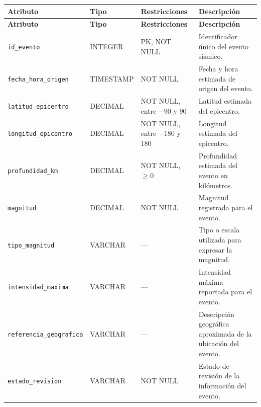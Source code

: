 \documentclass[12pt,a4paper]{article}
\begin{document}
{
\small
\setlength{\tabcolsep}{3pt}
\renewcommand{\arraystretch}{1.15}

\begin{longtable}{
    >{\raggedright\arraybackslash}p{4.25cm}
    >{\raggedright\arraybackslash}p{2.65cm}
    >{\raggedright\arraybackslash}p{3.85cm}
    >{\raggedright\arraybackslash}p{3.85cm}
}
\toprule
\textbf{Atributo} &
\textbf{Tipo} &
\textbf{Restricciones} &
\textbf{Descripción} \\
\midrule
\endfirsthead

\toprule
\textbf{Atributo} &
\textbf{Tipo} &
\textbf{Restricciones} &
\textbf{Descripción} \\
\midrule
\endhead

\texttt{id\_\allowbreak{}evento} &
INTEGER &
PK, NOT NULL &
Identificador único del evento sísmico. \\

\texttt{fecha\_\allowbreak{}hora\_\allowbreak{}origen} &
TIMESTAMP &
NOT NULL &
Fecha y hora estimada de origen del evento. \\

\texttt{latitud\_\allowbreak{}epicentro} &
DECIMAL &
NOT NULL, entre $-90$ y $90$ &
Latitud estimada del epicentro. \\

\texttt{longitud\_\allowbreak{}epicentro} &
DECIMAL &
NOT NULL, entre $-180$ y $180$ &
Longitud estimada del epicentro. \\

\texttt{profundidad\_\allowbreak{}km} &
DECIMAL &
NOT NULL, $\geq 0$ &
Profundidad estimada del evento en kilómetros. \\

\texttt{magnitud} &
DECIMAL &
NOT NULL &
Magnitud registrada para el evento. \\

\texttt{tipo\_\allowbreak{}magnitud} &
VARCHAR &
--- &
Tipo o escala utilizada para expresar la magnitud. \\

\texttt{intensidad\_\allowbreak{}maxima} &
VARCHAR &
--- &
Intensidad máxima reportada para el evento. \\

\texttt{referencia\_\allowbreak{}geografica} &
VARCHAR &
--- &
Descripción geográfica aproximada de la ubicación del evento. \\

\texttt{estado\_\allowbreak{}revision} &
VARCHAR &
NOT NULL &
Estado de revisión de la información del evento. \\

\bottomrule
\end{longtable}
}
\end{document}
